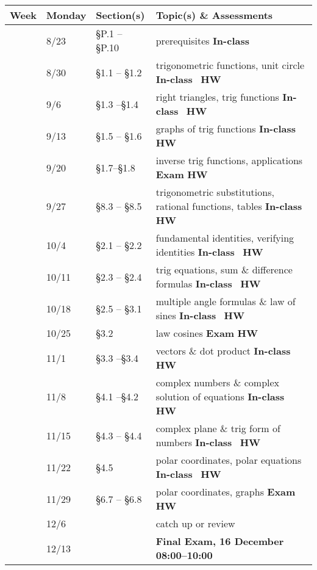 \documentclass[12pt]{article}
\newcounter{qz}\setcounter{qz}{0}
\newcommand{\qz}{%
\setcounter{qz}{\value{qz}+1}
\textbf{In-class  \theqz} \,}
\newcounter{hw}\setcounter{hw}{0}
\newcommand{\hw}{%
\setcounter{hw}{\value{hw}+1}
\textbf{HW \thehw} \,\,}
\newcounter{ex}\setcounter{ex}{0}
\newcommand{\ex}{%
\setcounter{ex}{\value{ex}+1}
Exam \theex}
\newcounter{wk}\setcounter{wk}{0}
\newcommand{\wk}{%
\setcounter{wk}{\value{wk}+1}
\thewk \,\,}
\begin{document}
\begin{center}
    \small
\begin{tabular}  {|l|l|l|l|}
\hline
{\bf Week}  & \textbf{Monday} &  {\bf Section(s)} & {\bf Topic(s) \& Assessments} \\
\hline \hline 
\wk    & 8/23 &    \S P.1 -- \S P.10   & prerequisites \hfill \qz  \\
\wk    & 8/30  &  \S1.1 -- \S1.2  &  trigonometric functions, unit circle  \hfill \qz \hw  \\
\wk    & 9/6 &     \S1.3 --\S1.4  &   right triangles, trig functions  \hfill \qz \hw \\
\wk    & 9/13  &     \S1.5 -- \S1.6  & graphs of trig functions  \hfill \qz \hw            \\
\wk    & 9/20 &  \S1.7--\S1.8    &  inverse trig functions, applications    \hfill \textbf{\ex} \hw \\ \hline
\wk    & 9/27   & \S8.3 -- \S8.5   & trigonometric substitutions, rational functions, tables  \hfill \qz \hw  \\
\wk    & 10/4     & \S2.1 -- \S2.2  & fundamental identities, verifying identities  \hfill \qz \hw  \\
\wk   & 10/11   & \S2.3 -- \S2.4  &  trig equations, sum \& difference formulas   \hfill \qz \hw  \\
\wk  &  10/18   & \S2.5 -- \S3.1 &  multiple angle formulas \& law of sines   \hfill \qz  \hw \\ 
\wk &  10/25     &   \S3.2&  law cosines   \hfill  \textbf{ \ex}  \hw \\ \hline
\wk  & 11/1  &   \S3.3 --\S3.4  &  vectors \& dot product  \hfill \qz  \hw  \\
\wk   & 11/8  & \S4.1 --\S4.2  &   complex numbers  \& complex solution of equations  \hfill \qz \hw \\
\wk   & 11/15& \S4.3 -- \S4.4   & complex plane \&  trig form of numbers  \hfill \qz \hw  \\
\wk   & 11/22   &  \S4.5     & polar coordinates, polar equations    \hfill \qz  \hw   \\
\wk   & 11/29    &  \S6.7 -- \S6.8      &  polar coordinates, graphs    \hfill \textbf{ \ex} \hw   \\ \hline
\wk   & 12/6      &         &  catch up or review  \\  
\wk   & 12/13      &  &     \hfill  \hfill  \textbf{ Final Exam, 16 December  08:00--10:00}  \\  \hline
   
\end{tabular}
\end{center}
\end{document}
